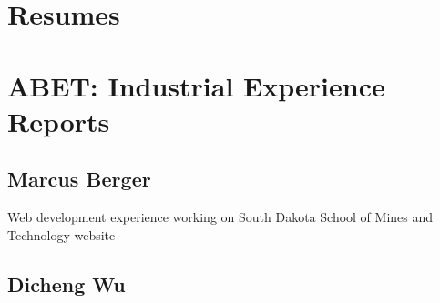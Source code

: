 

\section{Resumes}



%     

\section{ABET: Industrial Experience Reports}

\subsection{Marcus Berger}

Web development experience working on South Dakota School of Mines and Technology website

\subsection{Dicheng Wu}

% 


